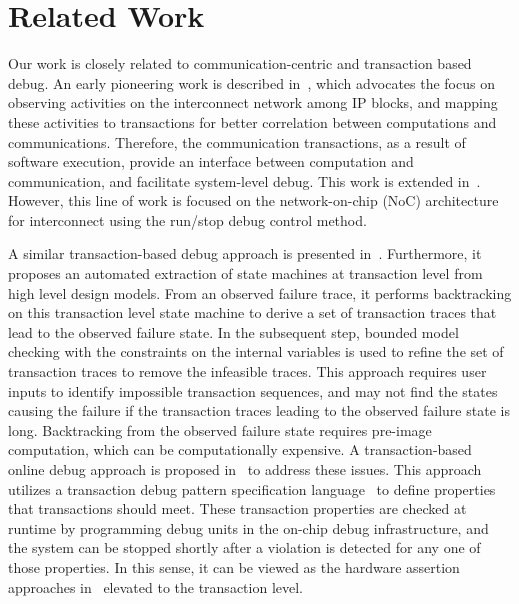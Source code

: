 \documentclass[conference]{IEEEtran}
\begin{document}
\section{Related Work}

Our work is closely related to communication-centric and transaction based debug.  An early pioneering work is described in~\cite{Goossens2007NOCS}, which advocates the focus on observing activities on the interconnect network among IP blocks, and mapping these activities to transactions for better correlation between computations and communications.  Therefore, the communication transactions, as a result of software execution, provide an interface between computation and communication, and facilitate  system-level debug.  This work is extended in~\cite{Vermeulen2009VLSI-DAT,Goossens2009DATE}.  However, this line of work is focused on the network-on-chip (NoC) architecture for interconnect using the run/stop debug control method.  

A similar transaction-based debug approach is presented in~\cite{Gharehbaghi2012ISQED}.  Furthermore, it proposes an automated extraction of state machines at transaction level from  high level design models.  From an observed failure trace, it performs backtracking on this transaction level state machine to derive a set of transaction traces that lead to the observed failure state.  In the subsequent step, bounded model checking with the constraints on the internal variables is used to refine the set of transaction traces to remove the infeasible traces.  This approach requires user inputs to identify impossible transaction sequences, and may not find the states causing the failure if the transaction traces leading to the observed failure state is long.  Backtracking from the observed failure state requires pre-image computation, which can be computationally expensive.  A transaction-based online debug approach is proposed in~\cite{Dehbash2014} to address these issues.  This approach utilizes a transaction debug pattern specification language~\cite{Gharehbaghi2009ICCD} to define properties that transactions should meet.  These transaction properties are checked at runtime by programming debug units in the on-chip debug infrastructure, and the system can be stopped shortly after a violation is detected for any one of those properties.  In this sense, it can be viewed as the hardware assertion approaches in~\cite{Boule2007ISQED} elevated to the transaction level. 
\end{document}

